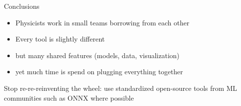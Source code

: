 \documentclass[aspectratio=169,9pt]{beamer}
\begin{document}
\begin{frame}[t]{Conclusions}
  \begin{itemize}
    \item Physicists work in small teams borrowing from each other
    \item Every tool is slightly different
    \item but many shared features (models, data, visualization)
    \item yet much time is spend on plugging everything together
  \end{itemize}
  \vspace*{.5cm}
  Stop re-re-reinventing the wheel: use standardized open-source tools from ML communities such as ONNX where possible\\\vspace*{1cm}
\end{frame}


\end{document}
